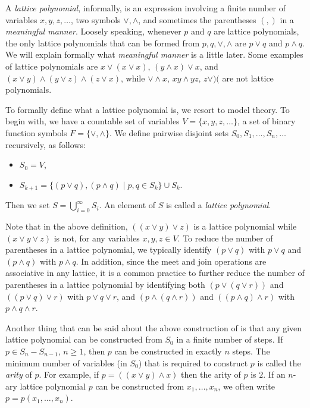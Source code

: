 \documentclass[12pt]{article}
\begin{document}
A \emph{lattice polynomial}, informally, is an expression involving a finite number of variables $x,y,z,\ldots$, two symbols $\vee,\wedge$, and sometimes the parentheses $(,)$ in a \emph{meaningful manner}.  Loosely speaking, whenever $p$ and $q$ are lattice polynomials, the only lattice polynomials that can be formed from $p,q,\vee,\wedge$ are $p\vee q$ and $p\wedge q$.  We will explain formally what \emph{meaningful manner} is a little later.  Some examples of lattice polynomials are $x\vee (x\vee x)$, $(y\wedge x)\vee x$, and $(x\vee y)\wedge (y\vee z)\wedge (z\vee x)$, while $\vee\wedge x$, $xy\wedge yz$, $z\vee)($ are not lattice polynomials.

To formally define what a lattice polynomial is, we resort to model theory.  To begin with, we have a countable set of variables $V=\lbrace x, y, z,\ldots \rbrace$, a set of binary function symbols $F=\lbrace \vee, \wedge\rbrace$.  We define pairwise disjoint sets $S_0,S_1,\ldots,S_n,\ldots$ recursively, as follows:
\begin{itemize}
\item $S_0=V$,
\item $S_{k+1}=\lbrace (p\vee q), (p\wedge q)\mid p,q\in S_k\rbrace\cup S_k$.
\end{itemize}
Then we set $S=\bigcup_{i=0}^{\infty} S_i$.  An element of $S$ is called a \emph{lattice polynomial}.

Note that in the above definition, $((x\vee y)\vee z)$ is a lattice polynomial while $(x\vee y\vee z)$ is not, for any variables $x,y,z\in V$.  To reduce the number of parentheses in a lattice polynomial, we typically identify $(p\vee q)$ with $p\vee q$ and $(p\wedge q)$ with $p\wedge q$.  In addition, since the meet and join operations are associative in any lattice, it is a common practice to further reduce the number of parentheses in a lattice polynomial by identifying both $(p\vee (q\vee r))$ and $((p \vee q)\vee r)$ with $p\vee q\vee r$, and $(p\wedge (q\wedge r))$ and $((p \wedge q)\wedge r)$ with $p\wedge q\wedge r$.

Another thing that can be said about the above construction of is that any given lattice polynomial can be constructed from $S_0$ in a finite number of steps.  If $p\in S_n-S_{n-1}$, $n\ge 1$, then $p$ can be constructed in exactly $n$ steps.  The minimum number of variables (in $S_0$) that is required to construct $p$ is called the \emph{arity} of $p$.  For example, if $p=((x\vee y)\wedge x)$ then the arity of $p$ is $2$.  If an $n$-ary lattice polynomial $p$ can be constructed from $x_1,\ldots,x_n$, we often write $p=p(x_1,\ldots,x_n)$.
\end{document}
